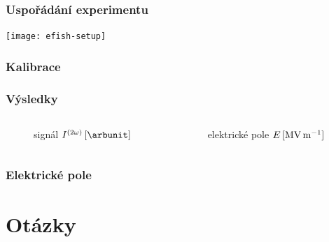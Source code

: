 \documentclass[10pt]{beamer}
\begin{document}
\begin{frame}
	\frametitle{Uspořádání experimentu}
	\texttt{[image: efish-setup]}
\end{frame}

\begin{frame}
	\frametitle{Kalibrace}
	
\end{frame}

\begin{frame}
	\frametitle{Výsledky}
	\begin{columns}
	\begin{column}{0.5\textwidth}
		\begin{figure}
			\centering
			\small
			signál \EFISH{} $\efish\,[\si{\arbunit}]$
			\medskip\par
			
		\end{figure}
	\end{column}
	\begin{column}{0.5\textwidth}
		\begin{figure}
			\centering
			\small
			elektrické pole $E\,[\si{\mega\volt\per\metre}]$
			\medskip\par
			
		\end{figure}
	\end{column}
	\end{columns}
\end{frame}

\begin{frame}
	\frametitle{Elektrické pole}
	\begin{figure}
		\centering
		
	\end{figure}
\end{frame}

\appendix
\section{Otázky}
\newcommand\question[1]{\begin{block}{Otázka}#1\end{block}}
\end{document}
